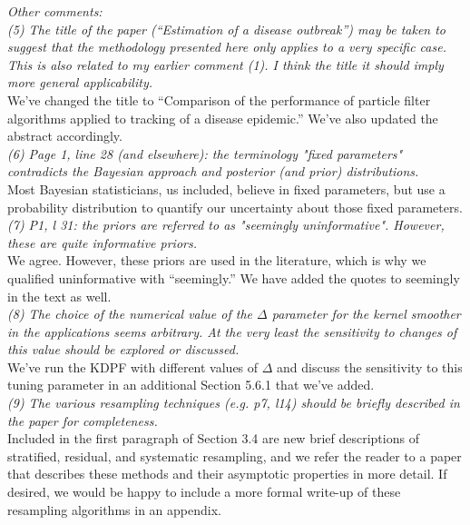 \documentclass{article}
\begin{document}
\noindent \emph{Other comments:} \\

\noindent \emph{(5) The title of the paper  (``Estimation of a disease outbreak'') may be taken to suggest that the methodology presented here only applies to a very specific case. This is also related to my earlier comment (1). I think the title  it should imply more general applicability.} \\

We've changed the title to ``Comparison of the performance of particle filter algorithms applied to tracking of a disease epidemic.'' We've also updated the abstract accordingly. \\

\noindent \emph{(6) Page 1, line 28 (and elsewhere): the terminology "fixed parameters" contradicts the Bayesian approach and posterior (and prior) distributions.} \\

Most Bayesian statisticians, us included, believe in fixed parameters, but use a probability distribution to quantify our uncertainty about those fixed parameters. \\

\noindent \emph{(7) P1, l 31: the priors are referred to as "seemingly uninformative". However, these are quite informative priors.} \\

We agree. However, these priors are used in the literature, which is why we qualified uninformative with ``seemingly.'' We have added the quotes to seemingly in the text as well. \\

\noindent \emph{(8) The choice of the numerical value of the $\Delta$ parameter for the kernel smoother in the applications seems arbitrary. At the very least the sensitivity to changes of this value should be explored or discussed.} \\

We've run the KDPF with different values of $\Delta$ and discuss the sensitivity to this tuning parameter in an additional Section 5.6.1 that we've added. \\

\noindent \emph{(9) The various resampling techniques (e.g. p7, l14) should be briefly described in the paper for completeness.} \\

Included in the first paragraph of Section 3.4 are new brief descriptions of stratified, residual, and systematic resampling, and we refer the reader to a paper that describes these methods and their asymptotic properties in more detail. If desired, we would be happy to include a more formal write-up of these resampling algorithms in an appendix. \\
\end{document}
